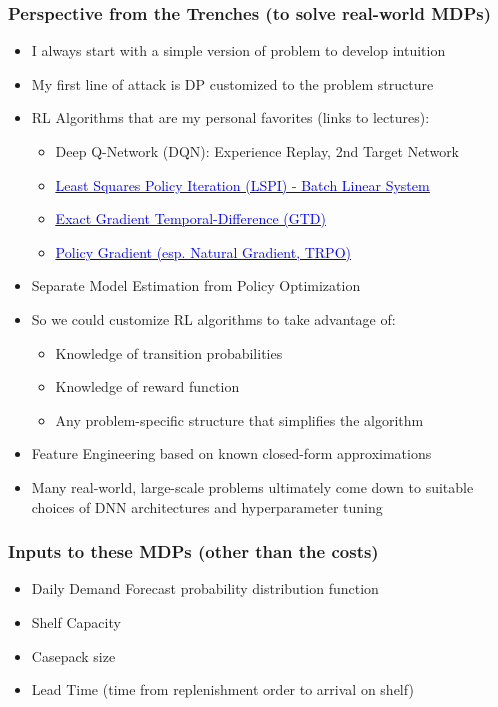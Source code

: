 \documentclass[handout]{beamer}
\begin{document}
\begin{frame}
\frametitle{Perspective from the Trenches (to solve real-world MDPs)}
\pause
\begin{itemize}[<+->]
\item I always start with a simple version of problem to develop intuition
\item My first line of attack is DP customized to the problem structure
\item RL Algorithms that are my personal favorites (links to lectures):
\begin{itemize}
\item Deep Q-Network (DQN): Experience Replay, 2nd Target Network
\item \href{https://github.com/coverdrive/technical-documents/blob/master/finance/cme241/ValueFunctionGeometry.pdf}{\underline{\textcolor{blue}{Least Squares Policy Iteration (LSPI) - Batch Linear System}}}
\item \href {https://github.com/coverdrive/technical-documents/blob/master/finance/cme241/ValueFunctionGeometry.pdf}{\underline{\textcolor{blue}{Exact Gradient Temporal-Difference (GTD)}}}
\item \href{https://github.com/coverdrive/technical-documents/blob/master/finance/cme241/PolicyGradient.pdf}{\underline{\textcolor{blue}{Policy Gradient (esp. Natural Gradient, TRPO)}}}
\end{itemize}
\item Separate Model Estimation from Policy Optimization
\item So we could customize RL algorithms to take advantage of:
\begin{itemize}
\item Knowledge of transition probabilities
\item Knowledge of reward function
\item Any problem-specific structure that simplifies the algorithm
\end{itemize}
\item Feature Engineering based on known closed-form approximations
\item Many real-world, large-scale problems ultimately come down to
suitable choices of DNN architectures and hyperparameter tuning
\end{itemize}
\end{frame}


\begin{frame}
\frametitle{Inputs to these MDPs (other than the costs)}
\pause
\begin{itemize}[<+->]
\item Daily Demand Forecast probability distribution function
\item Shelf Capacity
\item Casepack size
\item Lead Time (time from replenishment order to arrival on shelf)
\end{itemize}
\end{frame}
\end{document}
